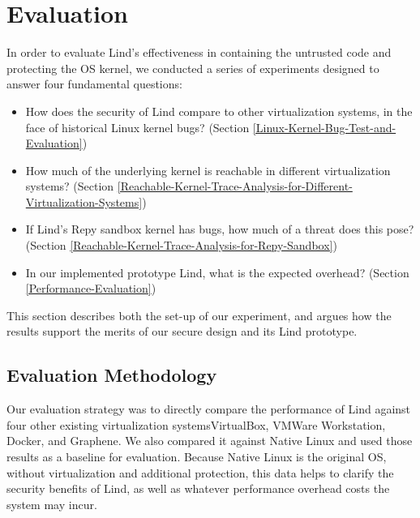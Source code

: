 \section{Evaluation}
\label{sec.evaluation}


In order to evaluate Lind's effectiveness in containing the untrusted code and protecting 
the OS kernel, we conducted a series of experiments designed to answer four fundamental 
questions: 

\begin{itemize}
\item How does the security of Lind compare to other virtualization systems, 
in the face of historical Linux kernel bugs?
(Section \ref{Linux-Kernel-Bug-Test-and-Evaluation})

\item How much of the underlying kernel is reachable in different
virtualization systems?
(Section \ref{Reachable-Kernel-Trace-Analysis-for-Different-Virtualization-Systems})

\item If Lind's Repy sandbox kernel has bugs, how much of a threat does this pose?
(Section \ref{Reachable-Kernel-Trace-Analysis-for-Repy-Sandbox})

\item In our implemented prototype Lind, what is the expected overhead?
(Section \ref{Performance-Evaluation})
\end{itemize}

This section describes both the set-up of our experiment, and argues
how the results support the merits of our secure design and its Lind prototype.

\subsection{Evaluation Methodology}

Our evaluation strategy was to directly compare the performance of Lind
against
four other existing virtualization systems\textendash VirtualBox, VMWare
Workstation,
Docker, and Graphene. We also compared it against Native Linux and used
those results as a baseline for evaluation. Because Native Linux is the
original OS,
without virtualization and additional protection, this data helps to
clarify the security benefits of Lind,
as well as whatever performance overhead costs the system may incur.

